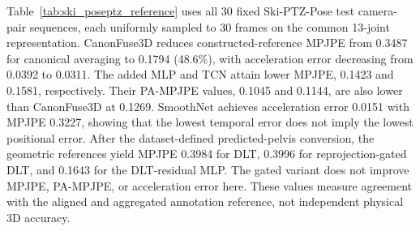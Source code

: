 \documentclass[preprint,12pt]{elsarticle}
\begin{document}


Table~\ref{tab:ski_poseptz_reference} uses all 30 fixed Ski-PTZ-Pose test camera-pair sequences, each uniformly sampled to 30 frames on the common 13-joint representation. CanonFuse3D reduces constructed-reference MPJPE from 0.3487 for canonical averaging to 0.1794 (48.6\%), with acceleration error decreasing from 0.0392 to 0.0311. The added MLP and TCN attain lower MPJPE, 0.1423 and 0.1581, respectively. Their PA-MPJPE values, 0.1045 and 0.1144, are also lower than CanonFuse3D at 0.1269. SmoothNet achieves acceleration error 0.0151 with MPJPE 0.3227, showing that the lowest temporal error does not imply the lowest positional error. After the dataset-defined predicted-pelvis conversion, the geometric references yield MPJPE 0.3984 for DLT, 0.3996 for reprojection-gated DLT, and 0.1643 for the DLT-residual MLP. The gated variant does not improve MPJPE, PA-MPJPE, or acceleration error here. These values measure agreement with the aligned and aggregated annotation reference, not independent physical 3D accuracy.
\end{document}
